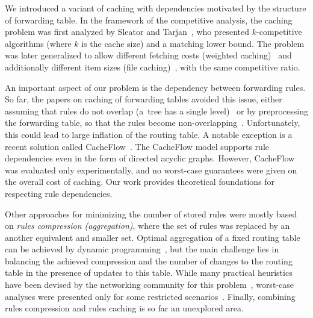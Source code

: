 We introduced a variant of caching with dependencies motivated by the structure of forwarding table.
In the framework of the competitive analysis, the caching problem was
first analyzed  by Sleator and Tarjan~\cite{SleTar85}, who presented $k$-competitive algorithms (where $k$ is the cache size) and a matching lower bound.
The problem was later generalized to allow different fetching
costs (weighted caching)~\cite{double-coverage,young-paging-greedy-dual} and
additionally different item sizes (file caching)~\cite{young-paging-landlord},
with the same competitive ratio.


An important aspect of our problem is the dependency between forwarding rules.
So far, the papers on caching of forwarding tables avoided this issue, either assuming
that rules do not overlap (a~tree has a single level)~\cite{route-caching-flat} 
or by preprocessing the forwarding table, so that the rules become
non-overlapping~\cite{prefix-caching,fib-caching-non-overlapping}.
Unfortunately, this could lead to large inflation of the routing table. A
notable exception is a recent solution called CacheFlow~\cite{cacheflow}. The
CacheFlow model supports rule  dependencies even in the form of directed acyclic
graphs. However, CacheFlow was evaluated only experimentally, and no
worst-case guarantees were given on the overall cost of caching. Our work
provides theoretical foundations for respecting rule dependencies.


Other approaches for minimizing the number of stored rules were mostly based
on \emph{rules compression (aggregation)}, where the set of rules was replaced
by an another equivalent and smaller set. Optimal aggregation of a fixed routing
table can be achieved by dynamic
programming~\cite{ortc,fib-compression-two-dimensional}, but the main
challenge lies in balancing the achieved compression and the number of changes
to the routing table in the presence of updates to this table. While
many practical heuristics have been devised by the networking community for
this problem~\cite{mms,fib-compression-fifa,fib-compression-globecom10,fib-compression-infocom13,fib-sigcomm,fib-compression-smalta,fib-compression-infocom10},
worst-case analyses were presented only for some restricted
scenarios~\cite{fib-icdcs,fib-sirocco}. Finally, combining rules compression and rules
caching is so far an unexplored area.



